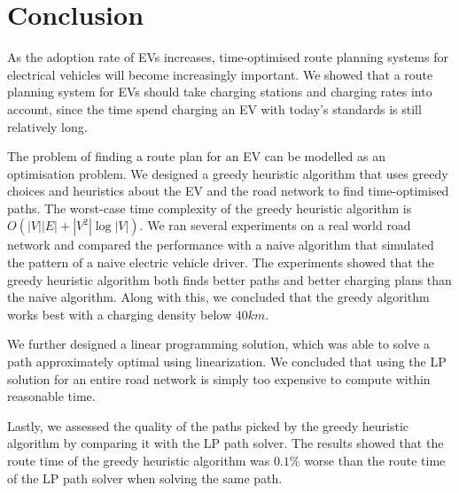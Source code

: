 \section{Conclusion}
\label{sec:conclusion}
As the adoption rate of EVs increases, time-optimised route planning systems for electrical vehicles will become increasingly important. 
We showed that a route planning system for EVs should take charging stations and charging rates into account, since the time spend 
charging an EV with today's standards is still relatively long.  

The problem of finding a route plan for an EV can be modelled as an optimisation problem. We designed a greedy heuristic algorithm that uses greedy choices and heuristics about the EV and the road network to find time-optimised paths. The worst-case time complexity of the greedy heuristic algorithm is $O(|V||E|+|V^2|\log|V|)$. We ran several experiments on a real world road network and compared the performance with a naive algorithm that simulated the pattern of a naive electric vehicle driver. The experiments showed that the greedy heuristic algorithm both finds better paths and better charging plans than the naive algorithm. Along with this, we concluded that the greedy algorithm works best with a charging density below $40\si{km}$. 

We further designed a linear programming solution, which was able to solve a path approximately optimal using linearization. We concluded that using the LP solution for an entire road network is simply too expensive to compute within reasonable time.

Lastly, we assessed the quality of the paths picked by the greedy heuristic algorithm by comparing it with the LP path solver. The results showed that the route time of the greedy heuristic algorithm was $0.1\%$ worse than the route time of the LP path solver when solving the same path. 
